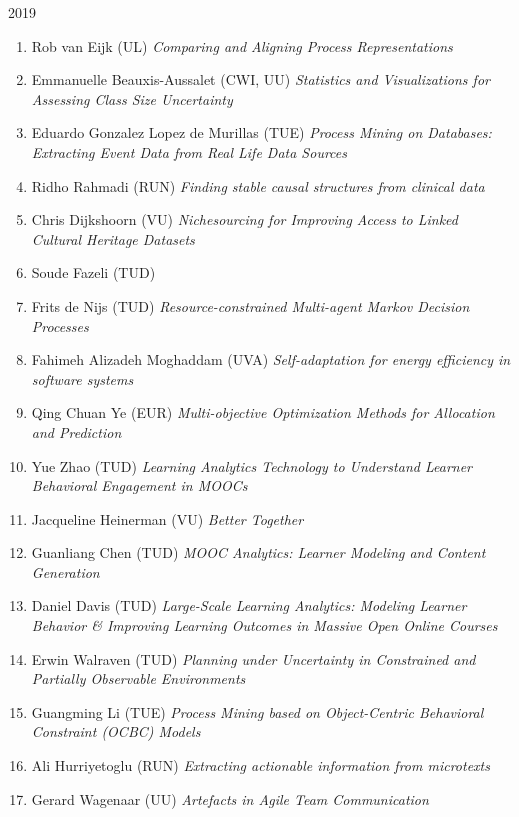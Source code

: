 \begin{multicols}{2}
\begin{scriptsize}
\vspace{0.2cm}
2019
\vspace{0.2cm}
\begin{enumerate}[leftmargin=*,noitemsep,topsep=0pt,parsep=1pt,partopsep=0pt]
\renewcommand{\labelenumi}{2019-\arabic{enumi}}
\item Rob van Eijk (UL)	\textit{Comparing and Aligning Process Representations}
\item Emmanuelle Beauxis-Aussalet (CWI, UU) \textit{Statistics and Visualizations for Assessing Class Size Uncertainty}
\item Eduardo Gonzalez Lopez de Murillas (TUE) \textit{Process Mining on Databases: Extracting Event Data from Real Life Data Sources}
\item Ridho Rahmadi (RUN) \textit{Finding stable causal structures from clinical data}
\item Chris Dijkshoorn (VU) \textit{Nichesourcing for Improving Access to Linked Cultural Heritage Datasets}
\item Soude Fazeli (TUD)
\item Frits de Nijs (TUD) \textit{Resource-constrained Multi-agent Markov Decision Processes}
\item Fahimeh Alizadeh Moghaddam (UVA) \textit{Self-adaptation for energy efficiency in software systems}
\item Qing Chuan Ye (EUR) \textit{Multi-objective Optimization Methods for Allocation and Prediction}
\item Yue Zhao (TUD) \textit{Learning Analytics Technology to Understand Learner Behavioral Engagement in MOOCs}
\item Jacqueline Heinerman (VU) \textit{Better Together}
\item Guanliang Chen (TUD) \textit{MOOC Analytics: Learner Modeling and Content Generation}
\item Daniel Davis (TUD) \textit{Large-Scale Learning Analytics: Modeling Learner Behavior \& Improving Learning Outcomes in Massive Open Online Courses}
\item Erwin Walraven (TUD) \textit{Planning under Uncertainty in Constrained and Partially Observable Environments}
\item Guangming Li (TUE) \textit{Process Mining based on Object-Centric Behavioral Constraint (OCBC) Models}
\item Ali Hurriyetoglu (RUN) \textit{Extracting actionable information from microtexts}
\item Gerard Wagenaar (UU) \textit{Artefacts in Agile Team Communication}

\end{enumerate}
\end{scriptsize}
\end{multicols}
